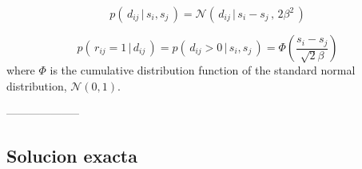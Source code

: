 \documentclass[article]{jss}
\newif\ifen
\newif\ifes
\newcommand{\en}[1]{\ifen#1\fi}
\newcommand{\es}[1]{\ifes#1\fi}
\newcommand{\N}{\mathcal{N}}
\begin{document}
%
\en{It can be shown, based on Gaussians properties, that the difference of performance $d_{ij}$ is also normally distributed, centered at the skill difference point with double variance.}
\es{}
%
\begin{equation}
 p( \, d_{ij} \,|\,  s_i, s_j\, ) = \N(\, d_{ij} \,|\, s_i - s_j \, , \, 2\beta^2 \,)
\end{equation}
%
\en{This reduces the problem of computing the probability of the game outcome to a single-dimension problem related to the performance difference.}
\es{This reduces the problem of computing the probability of the game outcome to a single-dimension problem related to the performance difference.}
%
\en{Let the result of a game $r_{ij} = \mathbb{I}(d_{ij}>0)$.
The probability of winning, $r_{ij} = 1$, can be computed as:}
\es{}
%
\begin{equation}
p(\,r_{ij}=1\,|\,d_{ij}\,) = p(\,d_{ij} > 0 \,|\, s_i, s_j\,) = \Phi \left(\frac{s_i - s_j}{\sqrt{2}\beta} \right)
\end{equation}
%
where $\Phi$ is the cumulative distribution function of the standard normal distribution, $\N(0, 1)$.










--------------------


\subsection{Solucion exacta}
\end{document}
